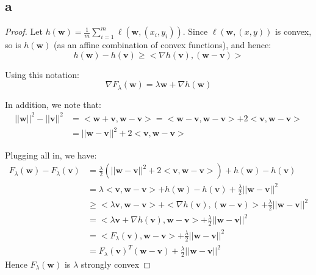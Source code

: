 \subsection*{a}
\begin{proof}    
    Let $h(\pmb{w}) = \frac{1}{m}\sum_{i=1}^m \ell\left(\pmb{w}, (x_i, y_i)\right)$. Since $\ell\left(\pmb{w}, (x, y)\right)$ is convex, so is $h(\pmb{w})$ (as an affine combination of convex functions), and hence:
    \begin{equation*}
        h(\pmb{w}) - h(\pmb{v}) \geq <\nabla h(\pmb{v}), (\pmb{w}-\pmb{v})>
    \end{equation*}
    
    Using this notation:
    \begin{equation*}
        \nabla F_\lambda(\pmb{w}) = \lambda \pmb{w} + \nabla h(\pmb{w})
    \end{equation*}

    In addition, we note that:    
    \begin{equation*}
        \begin{split}            
            ||\pmb{w}||^2 - ||\pmb{v}||^2 &= <\pmb{w} + \pmb{v}, \pmb{w} - \pmb{v}> = <\pmb{w} - \pmb{v}, \pmb{w} - \pmb{v}> + 2 <\pmb{v}, \pmb{w} - \pmb{v}> \\
            &= ||\pmb{w} - \pmb{v}||^2 + 2 <\pmb{v}, \pmb{w} - \pmb{v}>
        \end{split}
    \end{equation*}
    
    Plugging all in, we have:
    \begin{equation*}
        \begin{split}
            F_\lambda(\pmb{w}) - F_\lambda(\pmb{v}) &= \frac{\lambda}{2}(||\pmb{w} - \pmb{v}||^2 + 2 <\pmb{v}, \pmb{w} - \pmb{v}>) + h(\pmb{w}) - h(\pmb{v}) \\ 
            &=  \lambda <\pmb{v}, \pmb{w} - \pmb{v}> + h(\pmb{w}) - h(\pmb{v}) + \frac{\lambda}{2}||\pmb{w} - \pmb{v}||^2 \\
            &\geq <\lambda\pmb{v}, \pmb{w} - \pmb{v}> + <\nabla h(\pmb{v}), (\pmb{w}-\pmb{v})> + \frac{\lambda}{2}||\pmb{w} - \pmb{v}||^2 \\
            &= <\lambda\pmb{v} + \nabla h(\pmb{v}), \pmb{w} - \pmb{v}> + \frac{\lambda}{2}||\pmb{w} - \pmb{v}||^2 \\
            &= <F_\lambda(\pmb{v}), \pmb{w} - \pmb{v}> + \frac{\lambda}{2}||\pmb{w} - \pmb{v}||^2 \\
            &= F_\lambda(\pmb{v})^T (\pmb{w} - \pmb{v}) + \frac{\lambda}{2}||\pmb{w} - \pmb{v}||^2
        \end{split}
    \end{equation*}
    Hence $F_\lambda(\pmb{w})$ is $\lambda$ strongly convex
\end{proof}

